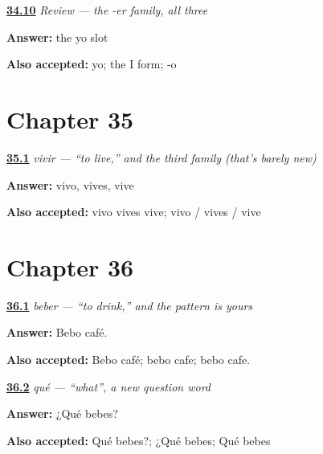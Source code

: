 \noindent\begin{minipage}[t]{\linewidth}
\raggedright
\hyperlink{review-ES-C07-repaso-comer-diff}{\textbf{34.10}} \emph{Review — the -er family, all three}\par
\small \textbf{Answer:} the yo slot\par
\footnotesize \textbf{Also accepted:} yo; the I form; -o
\end{minipage}\par\medskip

\section*{Chapter 35}

\noindent\begin{minipage}[t]{\linewidth}
\raggedright
\hyperlink{review-ES-C07-vivir-singular-forms}{\textbf{35.1}} \emph{vivir — \textquotedblleft{}to live,\textquotedblright{} and the third family (that's barely new)}\par
\small \textbf{Answer:} vivo, vives, vive\par
\footnotesize \textbf{Also accepted:} vivo vives vive; vivo / vives / vive
\end{minipage}\par\medskip

\section*{Chapter 36}

\noindent\begin{minipage}[t]{\linewidth}
\raggedright
\hyperlink{review-ES-C07-beber-coffee}{\textbf{36.1}} \emph{beber — \textquotedblleft{}to drink,\textquotedblright{} and the pattern is yours}\par
\small \textbf{Answer:} Bebo café.\par
\footnotesize \textbf{Also accepted:} Bebo café; bebo cafe; bebo cafe.
\end{minipage}\par\medskip

\noindent\begin{minipage}[t]{\linewidth}
\raggedright
\hyperlink{review-ES-C07-que-ask-drinking}{\textbf{36.2}} \emph{qué — \textquotedblleft{}what\textquotedblright{}, a new question word}\par
\small \textbf{Answer:} ¿Qué bebes?\par
\footnotesize \textbf{Also accepted:} Qué bebes?; ¿Qué bebes; Qué bebes
\end{minipage}\par\medskip

